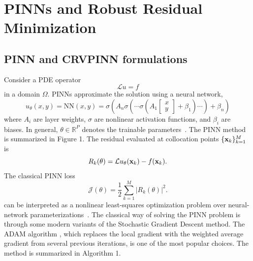 \documentclass[review]{elsarticle}
\newcommand{\R}{\mathbb{R}}
\newcommand{\Lop}{\mathcal{L}}
\begin{document}
\section{PINNs and Robust Residual Minimization}

\subsection{PINN and CRVPINN formulations}

Consider a PDE operator
\begin{equation}
\Lop u=f
\end{equation}
in a domain $\Omega$.
PINNs approximate the solution using a neural network, 
\begin{equation}
    u_\theta(x,y) = \mathrm{NN}(x,y) = \sigma(A_n \sigma ( \cdots \sigma( 
    A_1
    \begin{bmatrix}
    x\\y
    \end{bmatrix}
    + \beta_1) \cdots) + \beta_n)
\end{equation}
where $A_i$ are layer weights,  $\sigma$ are nonlinear activation functions, and $\beta_i$ are biases. In general,  $\theta\in\R^P$ denotes the trainable parameters~\cite{raissi}.
The PINN method is summarized in Figure 1.
The residual evaluated at collocation points $\{{\bf x}_k\}_{k=1}^M$ is
\begin{equation}
 R_k(\theta)=\Lop u_\theta({\bf x}_k)-f({\bf x}_k).
\end{equation}
The classical PINN loss 
\begin{equation}
 \mathcal{J}(\theta)=\frac12\sum_{k=1}^M |R_k(\theta)|^2.
\end{equation}
can be interpreted as a nonlinear least-squares optimization problem over neural-network parameterizations~\cite{deepritz,nocedal}.
The classical way of solving the PINN problem is through some modern variants of the Stochastic Gradient Descent method. The ADAM algorithm \cite{Adam}, which replaces the local gradient with the weighted average gradient from several previous iterations, is one of the most popular choices. The method is summarized in Algorithm 1.
\end{document}
